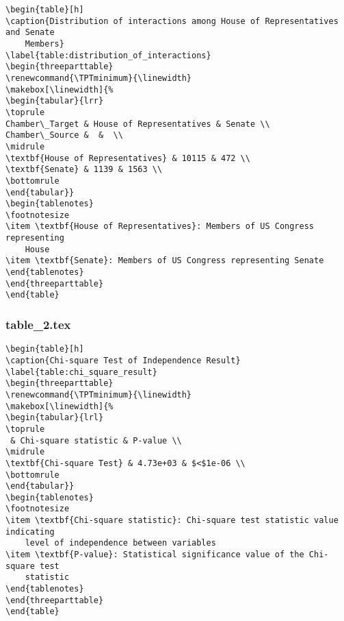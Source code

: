 \documentclass[11pt]{article}
\begin{document}
\begin{Verbatim}[tabsize=4]
\begin{table}[h]
\caption{Distribution of interactions among House of Representatives and Senate
	Members}
\label{table:distribution_of_interactions}
\begin{threeparttable}
\renewcommand{\TPTminimum}{\linewidth}
\makebox[\linewidth]{%
\begin{tabular}{lrr}
\toprule
Chamber\_Target & House of Representatives & Senate \\
Chamber\_Source &  &  \\
\midrule
\textbf{House of Representatives} & 10115 & 472 \\
\textbf{Senate} & 1139 & 1563 \\
\bottomrule
\end{tabular}}
\begin{tablenotes}
\footnotesize
\item \textbf{House of Representatives}: Members of US Congress representing
	House
\item \textbf{Senate}: Members of US Congress representing Senate
\end{tablenotes}
\end{threeparttable}
\end{table}

\end{Verbatim}

\subsubsection*{table\_2.tex}

\begin{Verbatim}[tabsize=4]
\begin{table}[h]
\caption{Chi-square Test of Independence Result}
\label{table:chi_square_result}
\begin{threeparttable}
\renewcommand{\TPTminimum}{\linewidth}
\makebox[\linewidth]{%
\begin{tabular}{lrl}
\toprule
 & Chi-square statistic & P-value \\
\midrule
\textbf{Chi-square Test} & 4.73e+03 & $<$1e-06 \\
\bottomrule
\end{tabular}}
\begin{tablenotes}
\footnotesize
\item \textbf{Chi-square statistic}: Chi-square test statistic value indicating
	level of independence between variables
\item \textbf{P-value}: Statistical significance value of the Chi-square test
	statistic
\end{tablenotes}
\end{threeparttable}
\end{table}

\end{Verbatim}
\end{document}
